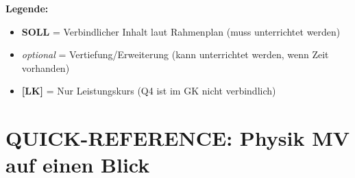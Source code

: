 \documentclass[11pt,a4paper]{article}
\newcommand{\lmark}{\textcolor{accentorange}{\textbf{[LK]}}}
\begin{document}
\vspace{0.5cm}

\begin{wichtigbox}
\textbf{Legende:}
\begin{itemize}[leftmargin=0.5cm, itemsep=1pt]
\item \textbf{SOLL} = Verbindlicher Inhalt laut Rahmenplan (muss unterrichtet werden)
\item \textit{optional} = Vertiefung/Erweiterung (kann unterrichtet werden, wenn Zeit vorhanden)
\item \lmark{} = Nur Leistungskurs (Q4 ist im GK nicht verbindlich)
\end{itemize}
\end{wichtigbox}

\newpage
\section*{QUICK-REFERENCE: Physik MV auf einen Blick}

\begin{center}
\end{center}

\vspace{0.3cm}
\end{document}
